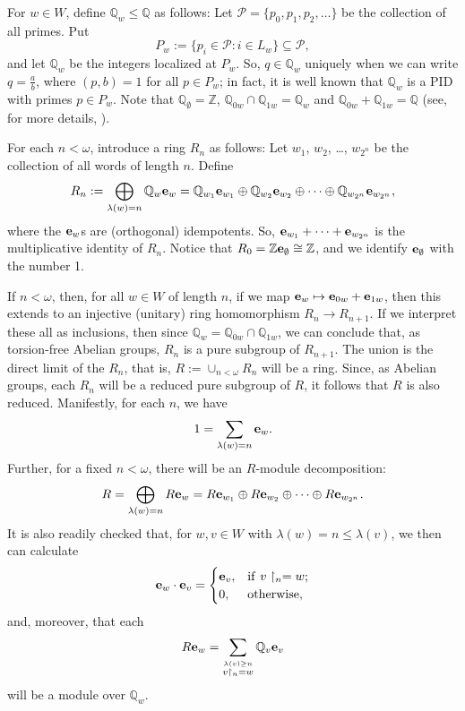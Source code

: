 \documentclass[12pt]{amsart}
\theoremstyle{definition}
\def\bbv#1{{\bf #1}}
\def\Z{{\mathbb Z}}
\def\Q{{\mathbb Q}}
\begin{document}
For $w\in W$, define $\Q_w\leq \Q$ as follows: Let $\mathcal P=\{p_0, p_1, p_2, \dots\}$ be the collection of all primes. Put
$$P_w:=\{p_i\in {\mathcal P}: i\in L_w\}\subseteq \mathcal P,$$
and let $\Q_w$ be the integers localized at $P_w$. So, $q\in \Q_w$ uniquely when we can write $q=\frac{a}{b}$, where $(p, b)=1$ for all $p\in P_w$; in fact, it is well known that $\Q_w$ is a PID with primes $p\in P_w$. Note that $\Q_\emptyset=\Z$, $\Q_{0w}\cap\Q_{1w}=\Q_w$ and $\Q_{0w}+\Q_{1w}=\Q$ (see, for more details, \cite[Proposition~1]{AR}).

For each $n<\omega$, introduce a ring $R_n$ as follows: Let $w_1$, $w_2$, \dots, $w_{2^n}$ be the collection of all words of length $n$. Define
$$
R_n:=\bigoplus_{\lambda (w)=n} \Q_w\bbv e_w=\Q_{w_1}\bbv e_{w_1} \oplus \Q_{w_2}\bbv e_{w_2}\oplus \cdots \oplus \Q_{w_{2^n}}\bbv e_{w_{2^n}},
$$
where the $\bbv e_w$s are (orthogonal) idempotents. So, $\bbv e_{w_1}+\cdots + \bbv e_{w_{2^n}}$ is the multiplicative identity of $R_n$. Notice that $R_0=\Z \bbv e_{\emptyset}\cong \Z$, and we identify $\bbv e_\emptyset$ with the number 1.

If $n<\omega$, then, for all $w\in W$ of length $n$, if we map $\bbv e_{w}\mapsto \bbv e_{0w}+\bbv e_{1w}$, then this extends to an injective (unitary) ring homomorphism $R_n\to R_{n+1}$. If we interpret these all as inclusions, then since $\Q_w=\Q_{0w}\cap \Q_{1w}$, we can conclude that, as torsion-free Abelian groups, $R_n$ is a pure subgroup of $R_{n+1}$. The union is the direct limit of the $R_n$, that is, $R:= \cup_{n<\omega} R_n$ will be a ring. Since, as Abelian groups, each $R_n$ will be a reduced pure subgroup of $R$, it follows that $R$ is also reduced. Manifestly, for each $n$, we have
$$
            1 = \sum_{\lambda(w)=n} \bbv e_w.
$$
Further, for a fixed $n<\omega$, there will be an $R$-module decomposition:
$$
          R=\bigoplus_{\lambda (w)=n} R\bbv e_w=R \bbv e_{w_1}\oplus R \bbv e_{w_2}\oplus \cdots \oplus R \bbv e_{w_{2^n}}.
$$
It is also readily checked that, for $w, v\in W$ with $\lambda (w)=n\leq \lambda (v)$, we then can calculate
$$
            \bbv e_w\cdot \bbv e_v=\begin{cases} \bbv e_v, & {\rm if}\ v\restriction_n=w;\cr
                                                    0,     & {\rm otherwise},\cr
                                   \end{cases}
$$
and, moreover, that each
$$R\bbv e_w=\sum_{\stackrel{\lambda(v)\geq n}{v\restriction_n=w}}\Q_v\bbv e_v$$
will be a module over $\Q_w$.
\end{document}
